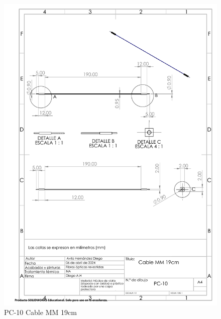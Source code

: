     \begin{figure}[H]
        \centering
        \includegraphics[scale=0.4]{3/Img/cableMMDibujo.pdf}
        \caption{PC-10 Cable MM 19cm} 
        \label{fig:cableMMDibujo}
    \end{figure}
